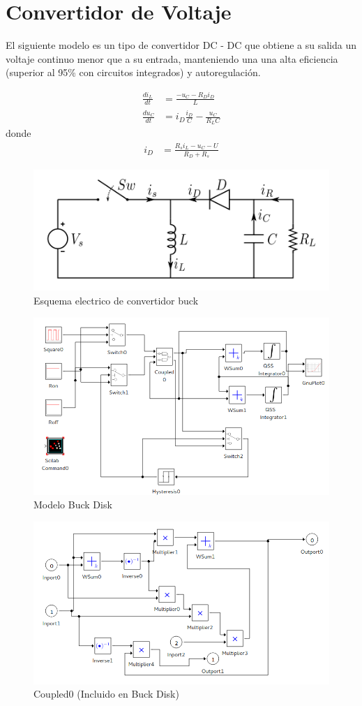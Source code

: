 \section{Convertidor de Voltaje}
	El siguiente modelo es un tipo de convertidor DC - DC que obtiene a su  salida  un  voltaje  continuo  menor  que  a  su entrada, manteniendo una una  alta eficiencia (superior al 95\% con circuitos integrados) y autoregulación.

\begin{align*}
\frac{di_{L}}{dt} & = \frac{-u_{C} - R_D i_D }{L}\\
\frac{du_C}{dt} & =i_D \frac{i_D}{C} - \frac{u_C}{R_L C }
\end{align*}
donde
\begin{align*}
i_D & = \frac{R_s i_L - u_C - U }{R_D + R_s}
\end{align*}


\begin{figure}[H]
\centering
 \includegraphics[width=.60\linewidth]{Buckboost_conventions}
 \caption{Esquema electrico de convertidor buck}
\end{figure}

\begin{figure}[H]
\includegraphics[width=0.75\linewidth]{buck_disk}
\caption{Modelo Buck Disk}
\end{figure}

\begin{figure}[H]
\includegraphics[width=0.75\linewidth]{buck_disk_coupled0}
\caption{Coupled0 (Incluido en Buck Disk)}
\end{figure}


